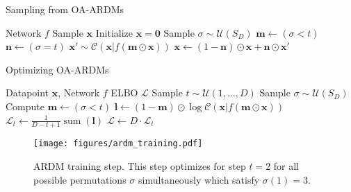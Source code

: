 \documentclass{article} \usepackage{iclr2022_conference,times}
\def\vl{{\bm{l}}}
\def\vm{{\bm{m}}}
\def\vn{{\bm{n}}}
\def\vx{{\bm{x}}}
\begin{document}
\begin{table}
\vspace{-.3cm}
\begin{minipage}[t]{.47\textwidth}
\begin{algorithm}[H]
   \caption{Sampling from OA-ARDMs}
   \label{alg:sample_ardms}
\begin{algorithmic}
 Network $f$
    Sample $\vx$
\STATE Initialize $\vx = \mathbf{0}$
\STATE Sample $\sigma \sim \mathcal{U}(S_D)$
\STATE $\vm \leftarrow (\sigma < t)$  $\vn \leftarrow (\sigma = t)$
    \STATE $\vx' \sim \mathcal{C}(\vx | f(\vm \odot \vx))$ 
    \STATE $\vx \leftarrow  (1 - \vn) \odot \vx + \vn \odot \vx'$
\ENDFOR
\end{algorithmic}
\end{algorithm}
\end{minipage}
\hfill
\begin{minipage}[t]{.47\textwidth}
\begin{algorithm}[H]
   \caption{Optimizing OA-ARDMs}
   \label{alg:optimize_ardms}
\begin{algorithmic}
    Datapoint $\vx$, Network $f$
    ELBO $\mathcal{L}$
\STATE Sample $t \sim \mathcal{U}(1, \ldots, D)$
\STATE Sample $\sigma \sim \mathcal{U}(S_D)$
\STATE Compute $\vm \leftarrow (\sigma < t)$
\STATE $\vl \leftarrow (1 - \vm) \odot \log \mathcal{C}(\vx | f(\vm \odot \vx))$
\STATE $\mathcal{L}_t \leftarrow  \frac{1}{D - t + 1} \operatorname{sum} (\vl)$
\STATE $\mathcal{L} \leftarrow D \cdot \mathcal{L}_t$
\end{algorithmic}
\end{algorithm}
\end{minipage}
\vspace{-.5cm}
\end{table}


\begin{wrapfigure}{r}{0.4\textwidth}
    \centering
    \vspace{-.2cm}
    \texttt{[image: figures/ardm\_training.pdf]}
    \vspace{-.1cm}
    \caption{ARDM training step. This step optimizes for step $t = 2$ for all possible permutations $\sigma$ simultaneously which satisfy $\sigma(1) = 3$.}
    \label{fig:training-step}
    \vspace{-.3cm}
\end{wrapfigure}
\end{document}
